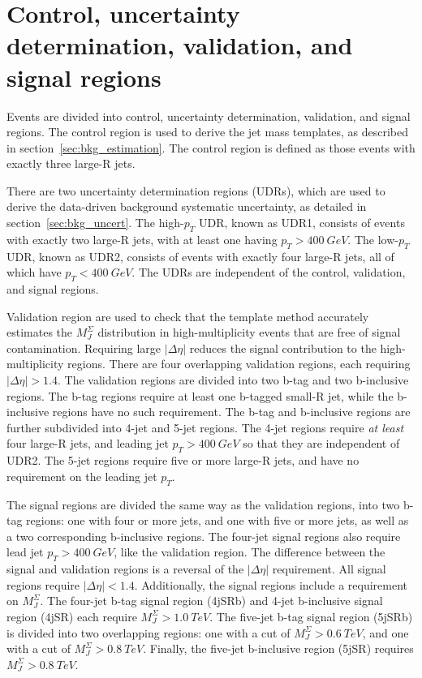 \section{Control, uncertainty determination, validation, and signal regions} \label{sec:region_defs}
Events are divided into control, uncertainty determination, validation, and signal regions.
The control region is used to derive the jet mass templates, as described in section~\ref{sec:bkg_estimation}.
The control region is defined as those events with exactly three large-R jets.

There are two uncertainty determination regions (UDRs), which are used to derive the data-driven background systematic uncertainty,
as detailed in section~\ref{sec:bkg_uncert}.
The high-$p_{T}$ UDR, known as UDR1, consists of events with exactly two large-R jets, with at least one having $p_{T}>400~GeV$.
The low-$p_{T}$ UDR, known as UDR2, consists of events with exactly four large-R jets, all of which have $p_{T}<400~GeV$.
The UDRs are independent of the control, validation, and signal regions.

Validation region are used to check that the template method accurately estimates the $M_J^{\Sigma}$ distribution in
high-multiplicity events that are free of signal contamination.
Requiring large $|\Delta\eta|$ reduces the signal contribution to the high-multiplicity regions.
There are four overlapping validation regions, each requiring $|\Delta\eta| > 1.4$.
The validation regions are divided into two b-tag and two b-inclusive regions.
The b-tag regions require at least one b-tagged small-R jet, while the b-inclusive regions have no such requirement.
The b-tag and b-inclusive regions are further subdivided into 4-jet and 5-jet regions.
The 4-jet regions require \textit{at least} four large-R jets, and leading jet $p_T>400~GeV$ so that they are independent of UDR2.
The 5-jet regions require five or more large-R jets, and have no requirement on the leading jet $p_T$.

The signal regions are divided the same way as the validation regions, into two b-tag regions: one with four or more jets,
and one with five or more jets, as well as a two corresponding b-inclusive regions.
The four-jet signal regions also require lead jet $p_T>400~GeV$, like the validation region.
The difference between the signal and validation regions is a reversal of the $|\Delta\eta|$ requirement.
All signal regions require $|\Delta\eta|<1.4$.
Additionally, the signal regions include a requirement on $M_J^{\Sigma}$.
The four-jet b-tag signal region (4jSRb) and 4-jet b-inclusive signal region (4jSR) each require $M_J^{\Sigma} > 1.0~TeV$.
The five-jet b-tag signal region (5jSRb) is divided into two overlapping regions: one with a cut of $M_J^{\Sigma}>0.6~TeV$,
and one with a cut of $M_J^{\Sigma}>0.8~TeV$.
Finally, the five-jet b-inclusive region (5jSR) requires $M_J^{\Sigma}>0.8~TeV$.

